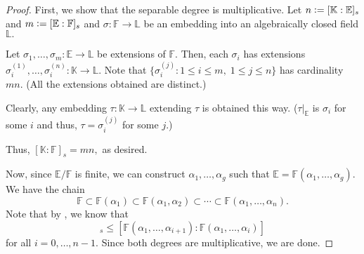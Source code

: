 \towerlawsep*\label{thm:towerlawsep2}
\begin{flushright}\hyperref[thm:towerlawsep]{\upsym}\end{flushright}
\begin{proof}
    First, we show that the separable degree is multiplicative. Let $n \vcentcolon= [\mathbb{K} : \mathbb{E}]_s$ and $m \vcentcolon= [\mathbb{E} : \mathbb{F}]_s$ and $\sigma : \mathbb{F} \to \mathbb{L}$ be an embedding into an algebraically closed field $\mathbb{L}.$ 

    Let $\sigma_1, \ldots, \sigma_m : \mathbb{E} \to \mathbb{L}$ be extensions of $\mathbb{F}.$ Then, each $\sigma_i$ has extensions $\sigma_i^{(1)}, \ldots, \sigma_i^{(n)} : \mathbb{K} \to \mathbb{L}.$ Note that $\{\sigma_i^{(j)} : 1 \le i \le m,\; 1 \le j \le n\}$ has cardinality $mn.$ (All the extensions obtained are distinct.)

    Clearly, any embedding $\tau : \mathbb{K} \to \mathbb{L}$ extending $\tau$ is obtained this way. ($\tau|_{\mathbb{E}}$ is $\sigma_i$ for some $i$ and thus, $\tau = \sigma_i^{(j)}$ for some $j.$) 

    Thus, $[\mathbb{K} : \mathbb{F}]_s = mn,$ as desired. 

    Now, since $\mathbb{E}/\mathbb{F}$ is finite, we can construct $\alpha_1, \ldots, \alpha_g$ such that $\mathbb{E} = \mathbb{F}(\alpha_1, \ldots, \alpha_g).$ We have the chain
    \begin{equation*} 
        \mathbb{F} \subset \mathbb{F}(\alpha_1) \subset \mathbb{F}(\alpha_1, \alpha_2) \subset \cdots \subset \mathbb{F}(\alpha_1, \ldots, \alpha_n).
    \end{equation*}
    Note that by , we know that 
    \begin{equation*} 
        [\mathbb{F}(\alpha_1, \ldots, \alpha_{i + 1}) : \mathbb{F}(\alpha_1, \ldots, \alpha_i)]_s \le [\mathbb{F}(\alpha_1, \ldots, \alpha_{i + 1}) : \mathbb{F}(\alpha_1, \ldots, \alpha_i)]
    \end{equation*}
    for all $i = 0, \ldots, n - 1.$ Since both degrees are multiplicative, we are done.
\end{proof}

